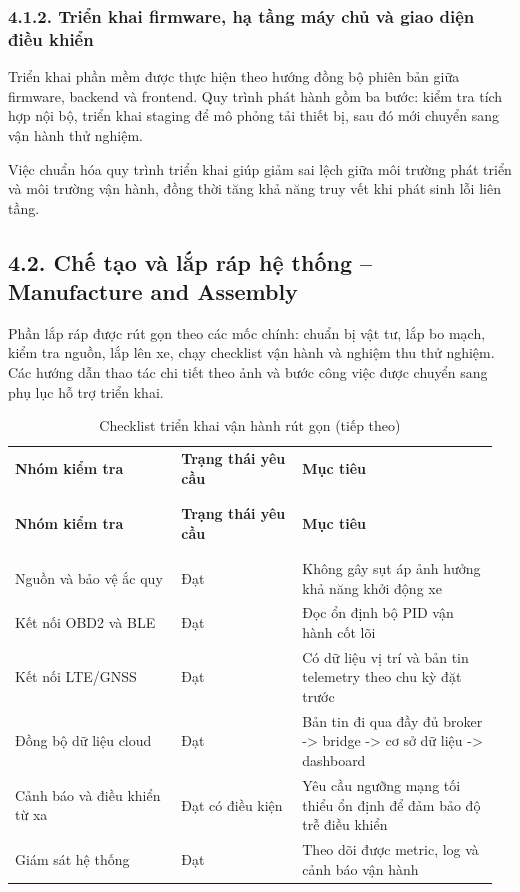 \documentclass[a4paper]{extarticle}
\newcommand{\thesissettableid}[2]{%
  \renewcommand{\thetable}{#1}%
  \renewcommand{\theHtable}{#2}%
}
\begin{document}
\subsubsection{4.1.2. Triển khai firmware, hạ tầng máy chủ và giao diện điều khiển}

Triển khai phần mềm được thực hiện theo hướng đồng bộ phiên bản giữa firmware, backend và frontend. Quy trình phát hành gồm ba bước: kiểm tra tích hợp nội bộ, triển khai staging để mô phỏng tải thiết bị, sau đó mới chuyển sang vận hành thử nghiệm.

Việc chuẩn hóa quy trình triển khai giúp giảm sai lệch giữa môi trường phát triển và môi trường vận hành, đồng thời tăng khả năng truy vết khi phát sinh lỗi liên tầng.

\subsection{4.2. Chế tạo và lắp ráp hệ thống -- Manufacture and Assembly}

Phần lắp ráp được rút gọn theo các mốc chính: chuẩn bị vật tư, lắp bo mạch, kiểm tra nguồn, lắp lên xe, chạy checklist vận hành và nghiệm thu thử nghiệm. Các hướng dẫn thao tác chi tiết theo ảnh và bước công việc được chuyển sang phụ lục hỗ trợ triển khai.

{\thesissettableid{4.2}{tab-condensed-ch4-deployment-checklist}
\def\LTcaptype{table}
\begin{longtable}{|L{0.330\linewidth}|L{0.240\linewidth}|L{0.390\linewidth}|}
\caption{Checklist triển khai vận hành rút gọn}\label{tab:condensed-ch4-deployment-checklist}\\
\hline \textbf{Nhóm kiểm tra} & \textbf{Trạng thái yêu cầu} & \textbf{Mục tiêu} \\
\\\hline
\endfirsthead
\caption[]{Checklist triển khai vận hành rút gọn (tiếp theo)}\\
\hline \textbf{Nhóm kiểm tra} & \textbf{Trạng thái yêu cầu} & \textbf{Mục tiêu} \\
\\\hline
\endhead
\\\hline
\endfoot
\endlastfoot
Nguồn và bảo vệ ắc quy & Đạt & Không gây sụt áp ảnh hưởng khả năng khởi động xe \\\hline
Kết nối OBD2 và BLE & Đạt & Đọc ổn định bộ PID vận hành cốt lõi \\\hline
Kết nối LTE/GNSS & Đạt & Có dữ liệu vị trí và bản tin telemetry theo chu kỳ đặt trước \\\hline
Đồng bộ dữ liệu cloud & Đạt & Bản tin đi qua đầy đủ broker -> bridge -> cơ sở dữ liệu -> dashboard \\\hline
Cảnh báo và điều khiển từ xa & Đạt có điều kiện & Yêu cầu ngưỡng mạng tối thiểu ổn định để đảm bảo độ trễ điều khiển \\\hline
Giám sát hệ thống & Đạt & Theo dõi được metric, log và cảnh báo vận hành \\\hline
\end{longtable}
}
\end{document}
